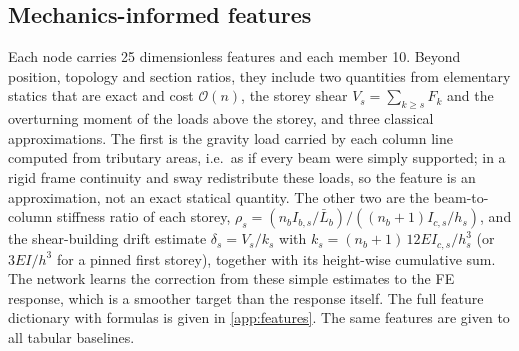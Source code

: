 \subsection{Mechanics-informed features}\label{sec:features}
Each node carries 25 dimensionless features and each member 10. Beyond position, topology and section ratios, they include two quantities from elementary statics that are exact and cost $\mathcal{O}(n)$, the storey shear $V_s=\sum_{k\ge s}F_k$ and the overturning moment of the loads above the storey, and three classical approximations. The first is the gravity load carried by each column line computed from tributary areas, i.e.\ as if every beam were simply supported; in a rigid frame continuity and sway redistribute these loads, so the feature is an approximation, not an exact statical quantity. The other two are the beam-to-column stiffness ratio of each storey, $\rho_s = (n_b I_{b,s}/\bar L_b)/((n_b+1)I_{c,s}/h_s)$, and the shear-building drift estimate $\delta_s = V_s/k_s$ with $k_s=(n_b+1)\,12EI_{c,s}/h_s^3$ (or $3EI/h^3$ for a pinned first storey), together with its height-wise cumulative sum. The network learns the correction from these simple estimates to the FE response, which is a smoother target than the response itself. The full feature dictionary with formulas is given in \ref{app:features}. The same features are given to all tabular baselines.

